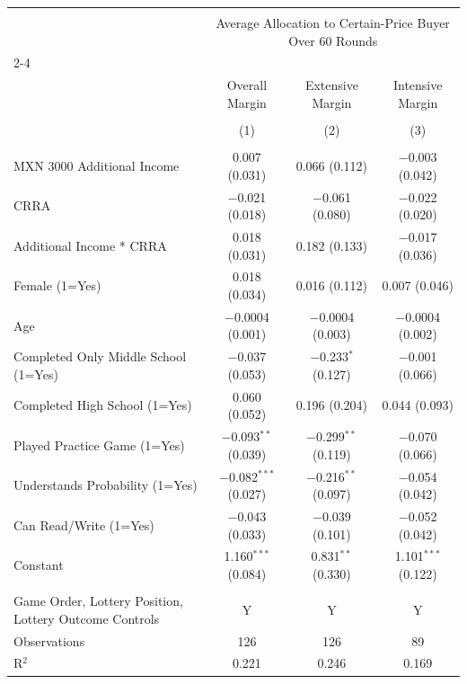 
\begin{table}[!htbp] \centering 
   
   
\begin{tabular}{@{\extracolsep{5pt}}lccc} 
\\[-1.8ex]\hline 
\hline \\[-1.8ex] 
 & \multicolumn{3}{c}{Average Allocation to Certain-Price Buyer Over 60 Rounds} \\ 
\cline{2-4} 
\\[-1.8ex] & Overall Margin & Extensive Margin & Intensive Margin \\ 
\\[-1.8ex] & (1) & (2) & (3)\\ 
\hline \\[-1.8ex] 
 MXN 3000 Additional Income & 0.007 (0.031) & 0.066 (0.112) & $-$0.003 (0.042) \\ 
  CRRA & $-$0.021 (0.018) & $-$0.061 (0.080) & $-$0.022 (0.020) \\ 
  Additional Income * CRRA & 0.018 (0.031) & 0.182 (0.133) & $-$0.017 (0.036) \\ 
  Female (1=Yes) & 0.018 (0.034) & 0.016 (0.112) & 0.007 (0.046) \\ 
  Age & $-$0.0004 (0.001) & $-$0.0004 (0.003) & $-$0.0004 (0.002) \\ 
  Completed Only Middle School (1=Yes) & $-$0.037 (0.053) & $-$0.233$^{*}$ (0.127) & $-$0.001 (0.066) \\ 
  Completed High School (1=Yes) & 0.060 (0.052) & 0.196 (0.204) & 0.044 (0.093) \\ 
  Played Practice Game (1=Yes) & $-$0.093$^{**}$ (0.039) & $-$0.299$^{**}$ (0.119) & $-$0.070 (0.066) \\ 
  Understands Probability (1=Yes) & $-$0.082$^{***}$ (0.027) & $-$0.216$^{**}$ (0.097) & $-$0.054 (0.042) \\ 
  Can Read/Write (1=Yes) & $-$0.043 (0.033) & $-$0.039 (0.101) & $-$0.052 (0.042) \\ 
  Constant & 1.160$^{***}$ (0.084) & 0.831$^{**}$ (0.330) & 1.101$^{***}$ (0.122) \\ 
 \hline \\[-1.8ex] 
Game Order, Lottery Position, Lottery Outcome Controls & Y & Y & Y \\ 
Observations & 126 & 126 & 89 \\ 
R$^{2}$ & 0.221 & 0.246 & 0.169 \\ 

\end{tabular}
\end{table}
